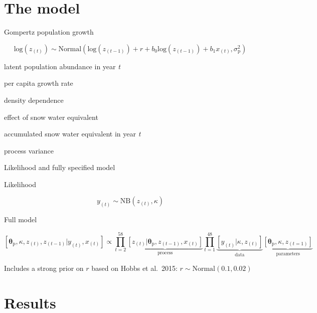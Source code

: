 \documentclass[11pt, compress, aspectratio=1610]{beamer}
\providecommand{\tightlist}{%
  \setlength{\itemsep}{0pt}\setlength{\parskip}{0pt}}
\begin{document}
\hypertarget{the-model}{%
\section{The model}\label{the-model}}

\begin{frame}{%
\protect\hypertarget{gompertz-population-growth}{%
Gompertz population growth}}

\[
\text{log}(z_{(t)}) \sim \text{Normal}\left( \text{log}(z_{(t-1)}) + r + b_0 \text{log}(z_{(t-1)}) + b_1 x_{(t)}, \sigma^2_\text{p} \right)
\]

\begin{description}
\tightlist
\item[\(z_t\)]
\alert{latent} population abundance in year \emph{t}
\item[\(r\)]
per capita growth rate
\item[\(b_0\)]
density dependence
\item[\(b_1\)]
effect of snow water equivalent
\item[\(x_t\)]
accumulated snow water equivalent in year \emph{t}
\item[\(\sigma^2_\text{p}\)]
process variance
\end{description}

\end{frame}

\begin{frame}{%
\protect\hypertarget{likelihood-and-fully-specified-model}{%
Likelihood and fully specified model}}

Likelihood

\[
 y_{(t)} \sim \text{NB} \left(  z_{(t)} , \kappa \right)
 \]

Full model

\[
 \left[ \boldsymbol{\theta}_\text{p}, \kappa, z_{(t)}, z_{(t-1)} | y_{(t)}, x_{(t)} \right ] \propto \prod_{t=2}^{58} \underbrace{\left[ z_{(t)} | \boldsymbol{\theta}_\text{p}, z_{(t-1)}, x_{(t)} \right]}_{\text{process}} \prod_{t=1}^{48} \underbrace{\left[ y_{(t)} | \kappa, z_{(t)} \right]}_{\text{data}} \underbrace{\left[ \boldsymbol{\theta}_\text{p}, \kappa, z_{(t=1)}\right]}_{\text{parameters}}
 \]

Includes a strong prior on \(r\) based on Hobbs et al.~2015:
\(r \sim \text{Normal}(0.1, 0.02)\)

\end{frame}

\hypertarget{results}{%
\section{Results}\label{results}}
\end{document}
